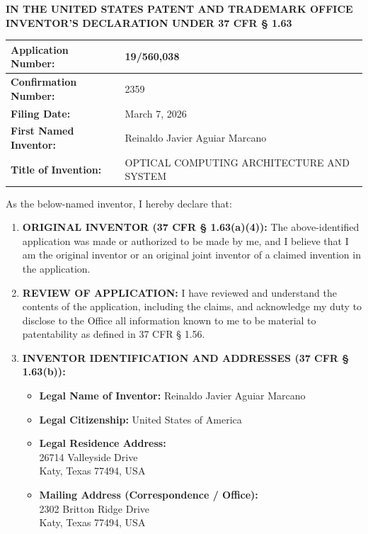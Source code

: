 \documentclass[11pt,letterpaper]{article}
\begin{document}
\thispagestyle{empty}

\begin{center}
    \large\textbf{IN THE UNITED STATES PATENT AND TRADEMARK OFFICE} \\
    \vspace{0.2cm}
    \textbf{\large INVENTOR'S DECLARATION UNDER 37 CFR \S{} 1.63}
\end{center}

\vspace{0.3cm}
\noindent\begin{tabular}{|p{2.5in}|p{3.8in}|}
\hline
\textbf{Application Number:} & 19/560,038 \\
\hline
\textbf{Confirmation Number:} & 2359 \\
\hline
\textbf{Filing Date:} & March 7, 2026 \\
\hline
\textbf{First Named Inventor:} & Reinaldo Javier Aguiar Marcano \\
\hline
\textbf{Title of Invention:} & OPTICAL COMPUTING ARCHITECTURE AND SYSTEM \\
\hline
\end{tabular}

\vspace{0.5cm}

As the below-named inventor, I hereby declare that:

\begin{enumerate}[leftmargin=2em, itemsep=6pt]
    \item \textbf{ORIGINAL INVENTOR (37 CFR \S{} 1.63(a)(4)):} The above-identified application was made or authorized to be made by me, and I believe that I am the original inventor or an original joint inventor of a claimed invention in the application.
    
    \item \textbf{REVIEW OF APPLICATION:} I have reviewed and understand the contents of the application, including the claims, and acknowledge my duty to disclose to the Office all information known to me to be material to patentability as defined in 37 CFR \S{} 1.56.
    
    \item \textbf{INVENTOR IDENTIFICATION AND ADDRESSES (37 CFR \S{} 1.63(b)):}
    \begin{itemize}[leftmargin=1.5em, itemsep=3pt]
        \item \textbf{Legal Name of Inventor:} Reinaldo Javier Aguiar Marcano
        \item \textbf{Legal Citizenship:} United States of America
        \item \textbf{Legal Residence Address:} \\
              26714 Valleyside Drive \\
              Katy, Texas 77494, USA
        \item \textbf{Mailing Address (Correspondence / Office):} \\
              2302 Britton Ridge Drive \\
              Katy, Texas 77494, USA
    \end{itemize}
\end{enumerate}
\end{document}
